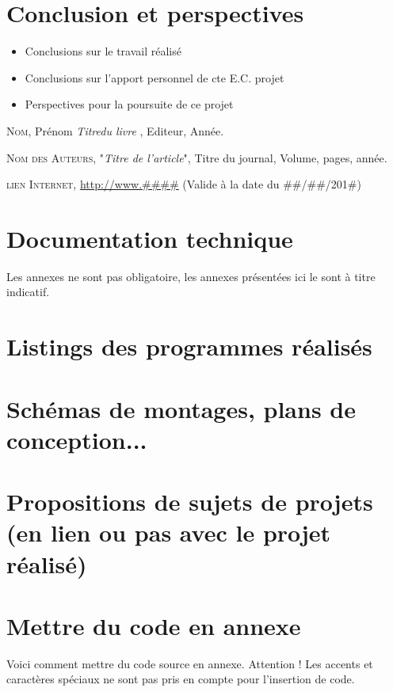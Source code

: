 \documentclass[a4paper, 12pt]{report} %
\begin{document}
\chapter*{Conclusion et perspectives}		%
\begin{itemize}
\item Conclusions sur le travail réalisé
\item Conclusions sur l'apport personnel de cte E.C. projet
\item Perspectives pour la poursuite de ce projet
\end{itemize}

\begin{thebibliography}{9}

		\textsc{Nom}, Prénom
		\textit{Titredu livre },
		Editeur, Année.

		\textsc{Nom des Auteurs},
		"\textit{Titre de l'article}",
		Titre du journal,
		Volume, pages, année.

\textsc{lien Internet},
		\url{http://www.\#\#\#\#}
		(Valide à la date du \#\#/\#\#/201\#)

\end{thebibliography}

\appendix

	\chapter{Documentation technique}

Les annexes ne sont pas obligatoire, les annexes présentées ici le sont à titre indicatif.
	\chapter{Listings des programmes réalisés}
	\chapter{Schémas de montages, plans de conception...}
	\chapter{Propositions de sujets de projets (en lien ou pas avec le projet réalisé)}
	\chapter{Mettre du code en annexe}

	Voici comment mettre du code source en annexe. Attention ! Les accents et caractères spéciaux ne sont pas pris en compte pour l'insertion de code.
\end{document}
